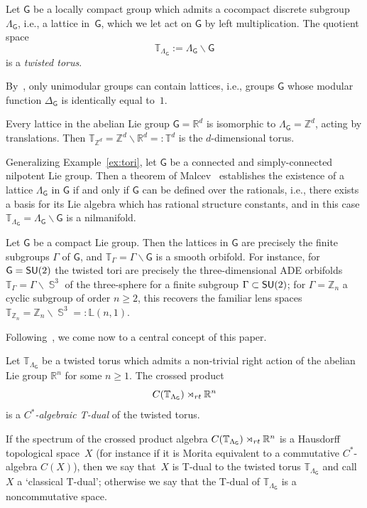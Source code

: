 \documentclass[11pt]{article}
\numberwithin{equation}{section}
\numberwithin{equation}{section}
\DeclareMathOperator{\Sphere}{\mathbb{S}}
\newcommand{\sfG}{\mathsf{G}}
\newcommand{\SU}{{\sf SU}}
\newcommand{\rt}{{\rm rt}}
\newcommand{\zed}{{\mathbb Z}} %
\newcommand{\real}{{\mathbb R}} %
\newcommand{\torus}{{\mathbb T}} %
\begin{document}
\begin{Definition}
Let $\sfG$ be a locally compact group which admits a
cocompact discrete subgroup $\Lambda_\sfG$, i.e., a lattice in~$\sfG$, which we let act on $\sfG$ by left
multiplication. The quotient space
\[
\torus_{\Lambda_\sfG}:=\Lambda_\sfG\backslash \sfG
\]
is a \emph{twisted torus}.
\end{Definition}

By~\cite[Lemma~6.2]{Milnor1976}, only unimodular groups can contain lattices, i.e., groups $\sfG$ whose
modular function $\Delta_\sfG$ is identically equal to~$1$.

\begin{Example}[tori]\label{ex:tori}
Every lattice in the abelian Lie group $\sfG=\real^d$ is
isomorphic to $\Lambda_\sfG=\zed^d$, acting by translations. Then
$\torus_{\zed^d}=\zed^d\backslash\real^d=:\torus^d$ is the $d$-dimensional torus.
\end{Example}

\begin{Example}[nilmanifolds]\label{ex:nilmanifolds}
Generalizing Example~\ref{ex:tori}, let $\sfG$ be a connected and simply-connected nilpotent Lie group. Then a theorem of
Malcev~\cite[Theorem~2.12]{Raghunathan1972} establishes the existence
of a lattice $\Lambda_\sfG$ in $\sfG$ if and only if
$\sfG$ can be defined over the rationals,
i.e., there exists a basis for its Lie algebra which has rational
structure constants, and in this case $\torus_{\Lambda_\sfG}=\Lambda_\sfG\backslash \sfG$ is a nilmanifold.
\end{Example}

\begin{Example}[orbifolds]
Let $\sfG$ be a compact Lie group. Then the lattices in $\sfG$ are
precisely the finite subgroups $\Gamma$ of $\sfG$, and
$\torus_\Gamma=\Gamma\backslash\sfG$ is a smooth orbifold. For instance,
for $\sfG=\SU(2)$ the twisted tori are precisely the three-dimensional
ADE orbifolds $\torus_\Gamma=\Gamma\backslash\Sphere^3$
of the three-sphere for a finite subgroup $\Gamma\subset\SU(2)$;
for $\Gamma=\zed_n$ a cyclic subgroup of order $n\geq2$, this recovers
the familiar lens spaces $\torus_{\zed_n}=\zed_n\backslash\Sphere^3=:\mathbb{L}(n,1)$.
\end{Example}

Following~\cite{Mathai2004}, we come now to a central concept of this paper.

\begin{Definition}\label{def:Tduality}
Let $\torus_{\Lambda_\sfG}$ be a twisted torus which admits a
non-trivial right action
of the abelian Lie group $\real^n$ for some $n\geq1$. The crossed product
\[
C(\torus_{\Lambda_\sfG})\rtimes_\rt \real^n
\]
is a \emph{$C^*$-algebraic T-dual} of the twisted torus.
\end{Definition}
If the spectrum of the crossed product algebra $
C(\torus_{\Lambda_\sfG})\rtimes_\rt \real^n
$ is a Hausdorff topological space~$X$ (for instance
if it is Morita
equivalent to a commutative $C^*$-algebra $C(X)$), then we say that~$X$ is T-dual to the
twisted torus $\torus_{\Lambda_\sfG}$ and call $X$ a `classical T-dual'; otherwise we say that the T-dual of
$\torus_{\Lambda_\sfG}$ is a noncommutative space.
\end{document}

